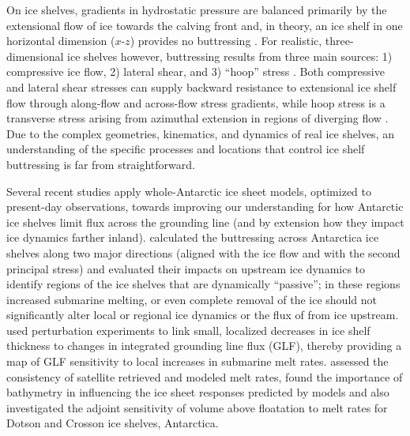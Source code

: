 \documentclass[review,oneside]{igs}
\begin{document}
On ice shelves, gradients in hydrostatic pressure are balanced primarily by the extensional flow of ice towards the calving front \citep{hutter1983, morland1987, schoof2007} and, in theory, an ice shelf in one horizontal dimension ($x$-$z$) provides no buttressing \citep{schoof2007,gudmundsson2013}. For realistic, three-dimensional ice shelves however,  buttressing results from three main sources: 1) compressive ice flow, 2) lateral shear, and 3) ``hoop'' stress \citep{pegler2012}. Both compressive and lateral shear stresses can supply backward resistance to extensional ice shelf flow through along-flow and across-flow stress gradients, while hoop stress is a transverse stress arising from azimuthal extension in regions of diverging flow \citep{wearing2016}.  Due to the complex geometries, kinematics, and dynamics of real ice shelves, an understanding of the specific processes and locations that control ice shelf buttressing is far from straightforward.



Several recent studies apply whole-Antarctic ice sheet models, optimized to present-day observations, towards improving our understanding for how Antarctic ice shelves limit flux across the grounding line (and by extension how they impact ice dynamics farther inland). \citet{furst2016} calculated the buttressing across Antarctica ice shelves along two major directions (aligned with the ice flow and with the second principal stress) and evaluated their impacts on upstream ice dynamics to identify regions of the ice shelves that are dynamically ``passive''; in these regions increased submarine melting, or even complete removal of the ice should not significantly alter local or regional ice dynamics or the flux of from ice upstream. \citet{reese2018} used perturbation experiments to link small, localized decreases in ice shelf thickness to changes in integrated grounding line flux (GLF), thereby providing a map of GLF sensitivity to local increases in submarine melt rates. \citet{Goldberg2019} assessed the consistency of satellite retrieved and modeled melt rates, found the importance of bathymetry in influencing the ice sheet responses predicted by models and also investigated the adjoint sensitivity of volume above floatation to melt rates for Dotson and Crosson ice shelves, Antarctica.
\end{document}
